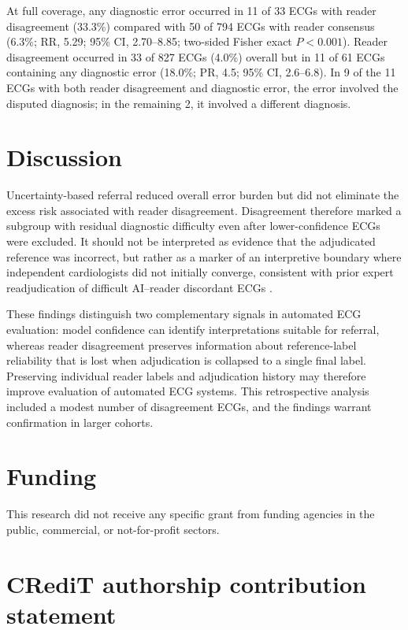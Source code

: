\documentclass[5p,times,twocolumn]{elsarticle}
\begin{document}
At full coverage, any diagnostic error occurred in 11 of 33 ECGs with reader
disagreement (33.3\%) compared with 50 of 794 ECGs with reader consensus
(6.3\%; RR, 5.29; 95\% CI, 2.70--8.85; two-sided Fisher exact $P<0.001$).
Reader disagreement occurred in 33 of 827 ECGs (4.0\%) overall but in 11 of 61
ECGs containing any diagnostic error (18.0\%; PR, 4.5; 95\% CI, 2.6--6.8).
In 9 of the 11 ECGs with both reader disagreement and diagnostic error, the error
involved the disputed diagnosis; in the remaining 2, it involved a different
diagnosis.

\section{Discussion}

Uncertainty-based referral reduced overall error burden but did not eliminate the
excess risk associated with reader disagreement. Disagreement therefore marked a
subgroup with residual diagnostic difficulty even after lower-confidence ECGs
were excluded. It should not be interpreted as evidence that the adjudicated
reference was incorrect, but rather as a marker of an interpretive boundary where
independent cardiologists did not initially converge, consistent with prior expert
readjudication of difficult AI--reader discordant ECGs \cite{mayourian2025}.

These findings distinguish two complementary signals in automated ECG evaluation:
model confidence can identify interpretations suitable for referral, whereas
reader disagreement preserves information about reference-label reliability that
is lost when adjudication is collapsed to a single final label. Preserving
individual reader labels and adjudication history may therefore improve evaluation
of automated ECG systems. This retrospective analysis included a modest number of
disagreement ECGs, and the findings warrant confirmation in larger cohorts.

\section*{Funding}

This research did not receive any specific grant from funding agencies in the
public, commercial, or not-for-profit sectors.

\section*{CRediT authorship contribution statement}
\end{document}
